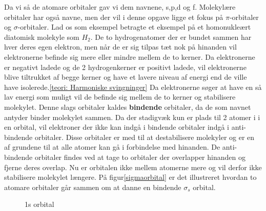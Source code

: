 Da vi så de atomare orbitaler gav vi dem navnene, s,p,d og f. Molekylære orbitaler har også navne, men der vil i denne opgave ligge et fokus på $\pi$-orbitaler og $\sigma$-orbitaler. Lad os som eksempel betragte et eksempel på et homonukleært diatomisk molekyle som $H_2$. De to hydrogenatomer der er bundet sammen har hver deres egen elektron, men når de er sig tilpas tæt nok på hinanden vil elektronerne befinde sig mere eller mindre mellem de to kerner. Da elektronerne er negativt ladede og de 2 hydrogenkerner er positivt ladede, vil elektronerne blive tiltrukket af begge kerner og have et lavere niveau af energi end de ville have isolerede.\ref{teori: Harmoniske svingninger} Da elektronerne søger at have en så lav energi som muligt vil de befinde sig mellem de to kerner og stabilisere molekylet. Denne slags orbitaler kaldes \textbf{bindende} orbitaler, da de som navnet antyder binder molekylet sammen. Da der stadigvæk kun er plads til 2 atomer i i en orbital, vil elektroner der ikke kan indgå i bindende orbitaler indgå i anti-bindende orbitaler. Disse orbitaler er med til at destabilisere molekyler og er en af grundene til at alle atomer kan gå i forbindelse med hinanden. De anti-bindende orbitaler findes ved at tage to orbitaler der overlapper hinanden og fjerne deres overlap. Nu er orbitalen ikke mellem atomerne mere og vil derfor ikke stabilisere molekylet længere. På figur\ref{sigmaorbital} er det illustreret hvordan to atomare orbitaler går sammen om at danne en bindende $\sigma_s$ orbital. 
\begin{center}
\begin{figure}[ht!]
  \centering
  \caption{1s orbital}
   \end{figure}\label{sigmaorbital}
	\end{center}
	
